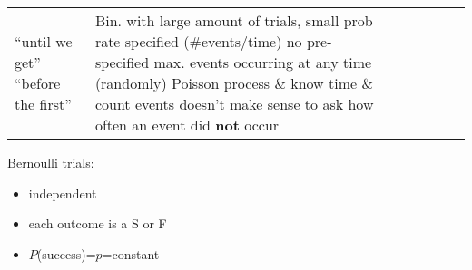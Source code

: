 {\begin{tabular}{ L{2.5cm} | L{3cm} | L{3cm} | L{3cm} | L{3.5cm} | L{3cm} | L{3cm} }
        ``until we get''
        \newline ``before the first''
     &
    
    Bin. with large amount of trials, small prob
        \newline rate specified (\#events/time)
        \newline no pre-specified max.
        \newline events occurring at any time (randomly)
        \newline Poisson process \& know time \& count events
        \newline doesn't make sense to ask how often
        an event did \textbf{not} occur
    
\end{tabular}}

Bernoulli trials: 
\begin{itemize}
    \item independent
    \item each outcome is a S or F
    \item $P$(success)=$p$=constant
\end{itemize}